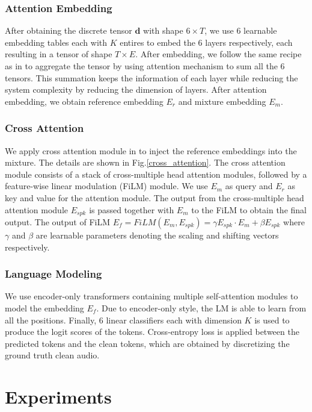 \documentclass[conference]{IEEEtran}
\begin{document}
\subsubsection{Attention Embedding}
After obtaining the discrete tensor \(\bm{d}\) with shape \(6 \times T\), we use 6
learnable embedding tables each with \(K\) entires to embed the 6 layers 
respectively, each resulting in a tensor of shape \(T \times E\). 
After embedding, we follow the same recipe as in \cite{dasb} to 
aggregate the tensor by using attention mechanism to sum all the 6 tensors. This summation 
keeps the information of each layer while reducing the system complexity by reducing the 
dimension of layers. After attention embedding, we obtain reference embedding \(E_r\) and 
mixture embedding \(E_m\).

\subsubsection{Cross Attention}
We apply cross attention module in \cite{usef_tes} to inject the reference embeddings into the mixture. The details 
are shown in Fig.\ref{cross_attention}.
The cross attention module consists of a stack of cross-multiple head attention modules, followed by
a feature-wise linear modulation (FiLM) module. 
We use \(E_m\) as query and \(E_r\) as key and value for 
the attention module. The output from the cross-multiple head attention module \(E_{spk}\)
is passed together with \(E_m\) to the FiLM to obtain the final output. The output of 
FiLM  \(E_f = FiLM(E_m, E_{spk}) = \gamma E_{spk} \cdot E_m  + \beta E_{spk} \) where 
\(\gamma\) and \(\beta\) are learnable parameters denoting the scaling and shifting vectors 
respectively.

\subsubsection{Language Modeling}
We use encoder-only transformers containing multiple self-attention modules to model the 
embedding \(E_f\). Due to encoder-only style, the LM is able to learn from all the positions. 
Finally, 6 linear classifiers each with dimension \(K\) is used to produce the logit scores of the tokens.
Cross-entropy loss is applied between the predicted tokens and the clean tokens, which are obtained by discretizing the ground truth clean audio.

\section{Experiments}
\end{document}
